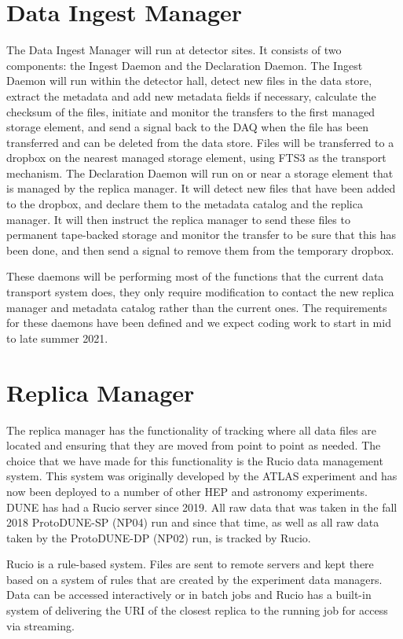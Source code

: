 \section{Data Ingest Manager}

The Data Ingest Manager will run at detector sites.  It consists of two components:  the Ingest Daemon and the Declaration Daemon.  The Ingest Daemon will 
run within the detector hall, detect new files in the data store, extract the metadata and add new metadata fields
if necessary, calculate the checksum of the files, initiate and monitor the transfers to the first managed 
storage element, and send a signal back to the DAQ when the file has been transferred and can be deleted from the data store.
Files will be transferred to a dropbox on the nearest managed storage element, using FTS3 as the transport mechanism.  
The Declaration Daemon will run on or near a storage element that is managed by the replica manager. 
It will detect new files that have been added to the dropbox, and declare them to the metadata catalog and the replica manager.  It will then instruct the replica manager to send these files to permanent tape-backed storage and monitor the transfer to be sure that this has been done, and then send a signal to remove them from the temporary dropbox.

These daemons will be performing most of the functions that the current data transport system does, they only 
require modification to contact the new replica manager and metadata catalog rather than the current ones.  The 
requirements for these daemons have been defined and we expect coding work to start in mid to late summer 2021.

\section{Replica Manager}

The replica manager has the functionality of tracking where all data files are located and ensuring that they 
are moved from point to point as needed.  The choice that we have made for this functionality is the Rucio data
management system.  This system was originally developed by the ATLAS experiment and has now been deployed to 
a number of other HEP and astronomy experiments.  DUNE has had a Rucio server since 2019.  All raw data that was
taken in the fall 2018 ProtoDUNE-SP (NP04) run and since that time, as well as all raw data taken by the ProtoDUNE-DP (NP02) run, is tracked by Rucio.

Rucio is a rule-based system.  Files are sent to remote servers and kept there based on a system of rules
that are created by the experiment data managers.  Data can be accessed interactively or in batch jobs and
Rucio has a built-in system of delivering the URI of the closest replica to the running job for access via streaming.

